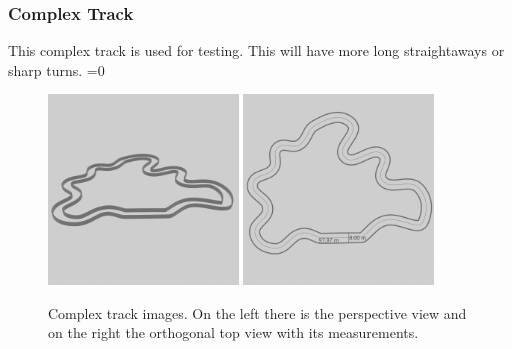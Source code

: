 \documentclass[14pt]{extarticle}
\newcounter{debug}
\begin{document}
\begin{flushleft}
	\subsubsection{Complex Track}
	This complex track is used for testing. This will have more long straightaways or sharp turns.
	\ifnum\value{debug}=0 {
	\begin{figure}[H]
    		\centering\includegraphics[width=0.45\textwidth]{./Image/Environment/Med/perspective.png}
			\centering\includegraphics[width=0.45\textwidth]{./Image/Environment/Med/top_w_line_mod.png}
    		
		\vspace{5mm}
		\caption{Complex track images. On the left there is the perspective view and on the right the orthogonal top view with its measurements.}
	\end{figure}
	}\fi
	

\end{flushleft}
\end{document}
